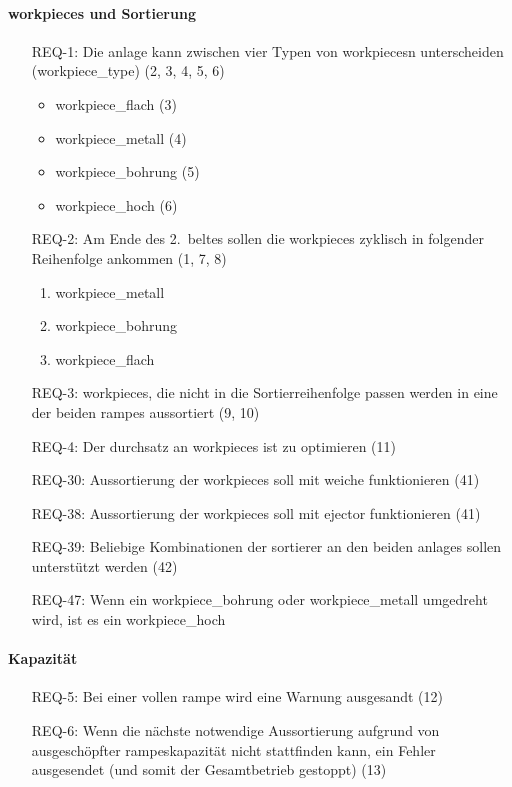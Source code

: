 \paragraph{\glspl{workpiece} und Sortierung}
\begin{itemize}
    \item[REQ-1:] Die \gls{anlage} kann zwischen vier Typen von \glspl{workpiece}n unterscheiden (\gls{workpiece_type}) (2, 3, 4, 5, 6)
    \begin{itemize}
        \item \gls{workpiece_flach} (3)
        \item \gls{workpiece_metall} (4)
        \item \gls{workpiece_bohrung} (5)
        \item \gls{workpiece_hoch} (6)
    \end{itemize}
    \item[REQ-2:] Am Ende des 2.\ \gls{belt}es sollen die \glspl{workpiece} zyklisch in folgender Reihenfolge ankommen (1, 7, 8)
    \begin{enumerate}
        \item \gls{workpiece_metall}
        \item \gls{workpiece_bohrung}
        \item \gls{workpiece_flach}
    \end{enumerate}
    \item[REQ-3:] \glspl{workpiece}, die nicht in die Sortierreihenfolge passen werden in eine der beiden \glspl{rampe} aussortiert (9, 10)
    \item[REQ-4:] Der \gls{durchsatz} an \glspl{workpiece} ist zu optimieren (11)
    \item[REQ-30:] Aussortierung der \glspl{workpiece} soll mit \gls{weiche} funktionieren (41)
    \item[REQ-38:] Aussortierung der \glspl{workpiece} soll mit \gls{ejector} funktionieren (41)
    \item[REQ-39:] Beliebige Kombinationen der \gls{sortierer} an den beiden \glspl{anlage} sollen unterstützt werden (42)
    \item[REQ-47:] Wenn ein \gls{workpiece_bohrung} oder \gls{workpiece_metall} umgedreht wird, ist es ein \gls{workpiece_hoch}
\end{itemize}

\paragraph{Kapazität}
\begin{itemize}
    \item[REQ-5:] Bei einer vollen \gls{rampe} wird eine Warnung ausgesandt (12)
    \item[REQ-6:] Wenn die nächste notwendige Aussortierung aufgrund von ausgeschöpfter \glspl{rampe}kapazität
    nicht stattfinden kann, ein Fehler ausgesendet (und somit der Gesamtbetrieb gestoppt) (13)
\end{itemize}

